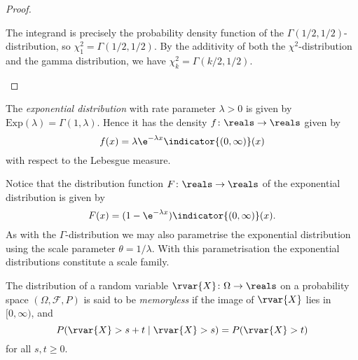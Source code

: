 \documentclass[article, a4paper, 11pt, oneside]{memoir}
\numberwithin{equation}{chapter}
\newcommand{\calF}{\mathcal{F}}
\begin{document}
\begin{proof}
\begin{proofsec}
    The integrand is precisely the probability density function of the $\Gamma(1/2,1/2)$-distribution, so $\chi^2_1 = \Gamma(1/2,1/2)$. By the additivity of both the $\chi^2$-distribution and the gamma distribution, we have $\chi^2_k = \Gamma(k/2,1/2)$.
\end{proofsec}
\end{proof}

\newcommand{\Exp}{\mathrm{Exp}}

\begin{definition}
    The \emph{exponential distribution} with rate parameter $\lambda > 0$ is given by $\Exp(\lambda) = \Gamma(1,\lambda)$. Hence it has the density $f \colon \reals \to \reals$ given by
    \begin{equation*}
        f(x)
            = \lambda \e^{-\lambda x} \indicator{(0,\infty)}(x)
    \end{equation*}
    with respect to the Lebesgue measure.
\end{definition}
%
Notice that the distribution function $F \colon \reals \to \reals$ of the exponential distribution is given by
%
\begin{equation*}
    F(x)
        = (1 - \e^{-\lambda x}) \indicator{(0,\infty)}(x).
\end{equation*}
%
As with the $\Gamma$-distribution we may also parametrise the exponential distribution using the scale parameter $\theta = 1/\lambda$. With this parametrisation the exponential distributions constitute a scale family.

The distribution of a random variable $\rvar{X} \colon \Omega \to \reals$ on a probability space $(\Omega, \calF, P)$ is said to be \emph{memoryless} if the image of $\rvar{X}$ lies in $[0,\infty)$, and
%
\begin{equation*}
    P(\rvar{X} > s+t \mid \rvar{X} > s)
        = P(\rvar{X} > t)
\end{equation*}
%
for all $s,t \geq 0$.
\end{document}
